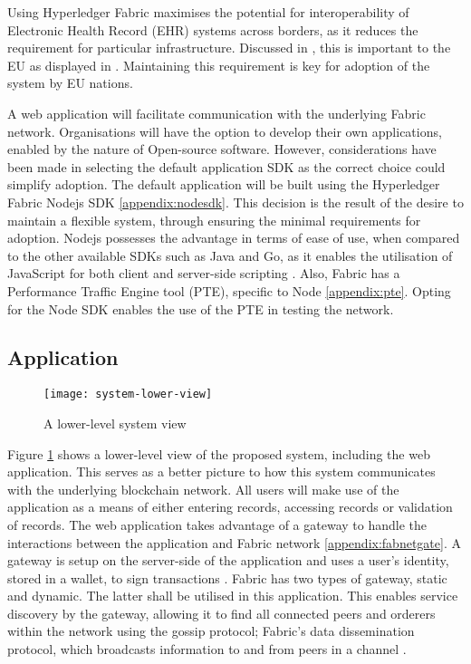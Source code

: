 Using Hyperledger Fabric maximises the potential for interoperability of Electronic Health Record (EHR) systems across borders, as it reduces the requirement for particular infrastructure. 
Discussed in \cite{kierkegaard_electronic_2011}, this is important to the EU as displayed in \cite{noauthor_directive_2011}. 
Maintaining this requirement is key for adoption of the system by EU nations.

A web application will facilitate communication with the underlying Fabric network. 
Organisations will have the option to develop their own applications, enabled by the nature of Open-source software. 
However, considerations have been made in selecting the default application SDK as the correct choice could simplify adoption. 
The default application will be built using the Hyperledger Fabric Nodejs SDK \ref{appendix:nodesdk}. 
This decision is the result of the desire to maintain a flexible system, through ensuring the minimal requirements for adoption. 
Nodejs possesses the advantage in terms of ease of use, when compared to the other available SDKs such as Java and Go, as it enables the utilisation of JavaScript for both client and server-side scripting \cite{nodejs_documentation_nodate}. 
Also, Fabric has a Performance Traffic Engine tool (PTE), specific to Node \ref{appendix:pte}. 
Opting for the Node SDK enables the use of the PTE in testing the network. 

\subsection{Application}

\begin{figure}[H]
  \texttt{[image: system-lower-view]}
  \caption{A lower-level system view}
  \label{fig:lower}
\end{figure}

Figure \ref{fig:lower} shows a lower-level view of the proposed system, including the web application. 
This serves as a better picture to how this system communicates with the underlying blockchain network. 
All users will make use of the application as a means of either entering records, accessing records or validation of records. 
The web application takes advantage of a gateway to handle the interactions between the application and Fabric network \ref{appendix:fabnetgate}. 
A gateway is setup on the server-side of the application and uses a user's identity, stored in a wallet, to sign transactions \cite{noauthor_gateway_nodate}. 
Fabric has two types of gateway, static and dynamic. 
The latter shall be utilised in this application. This enables service discovery by the gateway, allowing it to find all connected peers and orderers within the network using the gossip protocol; Fabric's data dissemination protocol, which broadcasts information to and from peers in a channel \cite{noauthor_gateway_nodate}. 



